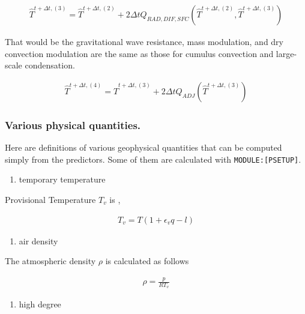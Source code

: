 \begin{eqnarray}
  \hat{T}^{t+\Delta t,(3)} = \hat{T}^{t+\Delta t,(2)}
              + 2 \Delta t Q_{RAD,DIF,SFC}
               (\hat{T}^{t+\Delta t,(2)},\hat{T}^{t+\Delta t,(3)})
\end{eqnarray}

That would be the gravitational wave resistance, mass modulation, and
dry convection modulation are the same as those for cumulus convection
and large-scale condensation.

\begin{eqnarray}
  \hat{T}^{t+\Delta t,(4)} = \hat{T}^{t+\Delta t,(3)}
              +  2 \Delta t Q_{ADJ}(\hat{T}^{t+\Delta t,(3)})
\end{eqnarray}

\hypertarget{various-physical-quantities.}{%
\subsubsection{Various physical
quantities.}\label{various-physical-quantities.}}

Here are definitions of various geophysical quantities that can be
computed simply from the predictors. Some of them are calculated with
\texttt{MODULE:{[}PSETUP{]}}.

\begin{enumerate}
\def\labelenumi{\arabic{enumi}.}
\tightlist
\item
  temporary temperature
\end{enumerate}

Provisional Temperature \(T_v\) is ,

\begin{eqnarray}
  T_v = T ( 1 + \epsilon_v q - l )
\end{eqnarray}

\begin{enumerate}
\def\labelenumi{\arabic{enumi}.}
\setcounter{enumi}{1}
\tightlist
\item
  air density
\end{enumerate}

The atmospheric density \(\rho\) is calculated as follows

\begin{eqnarray}
  \rho = \frac{p}{RT_v}
\end{eqnarray}

\begin{enumerate}
\def\labelenumi{\arabic{enumi}.}
\setcounter{enumi}{2}
\tightlist
\item
  high degree
\end{enumerate}

